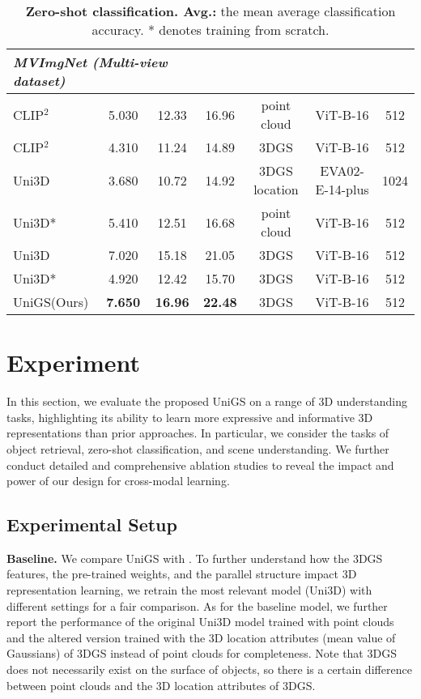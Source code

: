 \begin{table}[t]
\begin{tabularx}{\textwidth}{ l | c c c | c| c |c }
 \midrule  \midrule
    \multicolumn{3}{l}{\textit{\textbf{MVImgNet (Multi-view dataset)}}} \\
    \midrule
CLIP$^2$ & 5.030 & 12.33 & 16.96 & point cloud & ViT-B-16 & 512\\
 CLIP$^2$ & 4.310 & 11.24 & 14.89 & 3DGS & ViT-B-16 & 512\\
 Uni3D & 3.680 & 10.72 & 14.92 & 3DGS location & EVA02-E-14-plus & 1024\\
 Uni3D* & 5.410 & 12.51 & 16.68 & point cloud & ViT-B-16 & 512\\
 Uni3D & 7.020 & 15.18 & 21.05 & 3DGS & ViT-B-16 & 512\\
Uni3D* & 4.920 & 12.42 & 15.70 & 3DGS & ViT-B-16 & 512\\
\midrule
\rowcolor{mygray} UniGS(Ours) & \textbf{7.650} & \textbf{16.96} & \textbf{22.48} & 3DGS & ViT-B-16 & 512\\
\bottomrule
\end{tabularx}

		\caption{\textbf{Zero-shot classification. Avg.: }the mean average classification accuracy. * denotes training from scratch. }
  \label{tab:classification}
  \vspace{-6mm}
\end{table}

\vspace{-3mm}
\section{Experiment}
\label{sec:experiment}
\vspace{-3mm}
In this section, we evaluate the proposed UniGS on a range of 3D understanding tasks, highlighting its ability to learn more expressive and informative 3D representations than prior approaches. In particular, we consider the tasks of object retrieval, zero-shot classification, and scene understanding. We further conduct detailed and comprehensive ablation studies to reveal the impact and power of our design for cross-modal learning.

\vspace{-3mm}
\subsection{Experimental Setup}
\vspace{-3mm}

\textbf{Baseline.} We compare UniGS with \citep{zeng2023clip2,zhou2024uni3d,zhang2024tamm,qi2023contrast,qi2024shapellm}. To further understand how the 3DGS features, the pre-trained weights, and the parallel structure impact 3D representation learning, we retrain the most relevant model (Uni3D) with different settings for a fair comparison. 
%
As for the baseline model, we further report the performance of the original Uni3D model trained with point clouds and the altered version trained with the 3D location attributes (mean value of Gaussians) of 3DGS instead of point clouds for completeness. Note that 3DGS does not necessarily exist on the surface of objects, so there is a certain difference between point clouds and the 3D location attributes of 3DGS.

